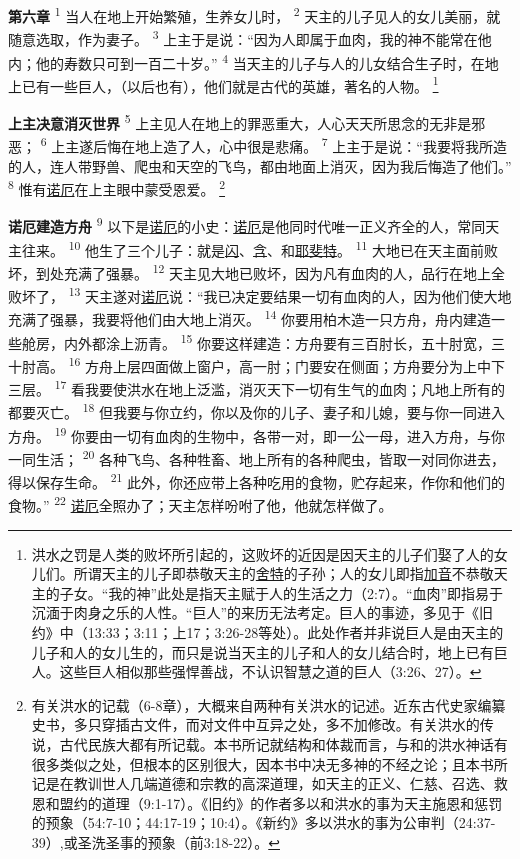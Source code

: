 \textbf{第六章\quad}
\textsuperscript{1}
当人在地上开始繁殖，生养女儿时，
\textsuperscript{2}
天主的儿子见人的女儿美丽，就随意选取，作为妻子。
\textsuperscript{3}
上主于是说：“因为人即属于血肉，我的神不能常在他内；他的寿数只可到一百二十岁。”
\textsuperscript{4}
当天主的儿子与人的儿女结合生子时，在地上已有一些巨人，（以后也有），他们就是古代的英雄，著名的人物。
\footnote{洪水之罚是人类的败坏所引起的，这败坏的近因是因天主的儿子们娶了人的女儿们。所谓天主的儿子即恭敬天主的\uline{舍特}的子孙；人的女儿即指\uline{加音}不恭敬天主的子女。“我的神”此处是指天主赋于人的生活之力（2:7）。“血肉”即指易于沉湎于肉身之乐的人性。“巨人”的来历无法考定。巨人的事迹，多见于《旧约》中（13:33；3:11；上17；3:26-28等处）。此处作者并非说巨人是由天主的儿子和人的女儿生的，而只是说当天主的儿子和人的女儿结合时，地上已有巨人。这些巨人相似那些强悍善战，不认识智慧之道的巨人（3:26、27）。}

\textbf{上主决意消灭世界\quad}
\textsuperscript{5}
上主见人在地上的罪恶重大，人心天天所思念的无非是邪恶；
\textsuperscript{6}
上主遂后悔在地上造了人，心中很是悲痛。
\textsuperscript{7}
上主于是说：“我要将我所造的人，连人带野兽、爬虫和天空的飞鸟，都由地面上消灭，因为我后悔造了他们。”
\textsuperscript{8}
惟有\uline{诺厄}在上主眼中蒙受恩爱。
\footnote{有关洪水的记载（6-8章），大概来自两种有关洪水的记述。近东古代史家编纂史书，多只穿插古文件，而对文件中互异之处，多不加修改。有关洪水的传说，古代民族大都有所记载。本书所记就结构和体裁而言，与和的洪水神话有很多类似之处，但根本的区别很大，因本书中决无多神的不经之论；且本书所记是在教训世人几端道德和宗教的高深道理，如天主的正义、仁慈、召选、救恩和盟约的道理（9:1-17）。《旧约》的作者多以和洪水的事为天主施恩和惩罚的预象（54:7-10；44:17-19；10:4）。《新约》多以洪水的事为公审判（24:37-39）,或圣洗圣事的预象（前3:18-22）。}

\textbf{诺厄建造方舟\quad}
\textsuperscript{9}
以下是\uline{诺厄}的小史：\uline{诺厄}是他同时代唯一正义齐全的人，常同天主往来。
\textsuperscript{10}
他生了三个儿子：就是\uline{闪}、\uline{含}、和\uline{耶斐特}。
\textsuperscript{11}
大地已在天主面前败坏，到处充满了强暴。
\textsuperscript{12}
天主见大地已败坏，因为凡有血肉的人，品行在地上全败坏了，
\textsuperscript{13}
天主遂对\uline{诺厄}说：“我已决定要结果一切有血肉的人，因为他们使大地充满了强暴，我要将他们由大地上消灭。
\textsuperscript{14}
你要用柏木造一只方舟，舟内建造一些舱房，内外都涂上沥青。
\textsuperscript{15}
你要这样建造：方舟要有三百肘长，五十肘宽，三十肘高。
\textsuperscript{16}
方舟上层四面做上窗户，高一肘；门要安在侧面；方舟要分为上中下三层。
\textsuperscript{17}
看我要使洪水在地上泛滥，消灭天下一切有生气的血肉；凡地上所有的都要灭亡。
\textsuperscript{18}
但我要与你立约，你以及你的儿子、妻子和儿媳，要与你一同进入方舟。
\textsuperscript{19}
你要由一切有血肉的生物中，各带一对，即一公一母，进入方舟，与你一同生活；
\textsuperscript{20}
各种飞鸟、各种牲畜、地上所有的各种爬虫，皆取一对同你进去，得以保存生命。
\textsuperscript{21}
此外，你还应带上各种吃用的食物，贮存起来，作你和他们的食物。”
\textsuperscript{22}
\uline{诺厄}全照办了；天主怎样吩咐了他，他就怎样做了。

